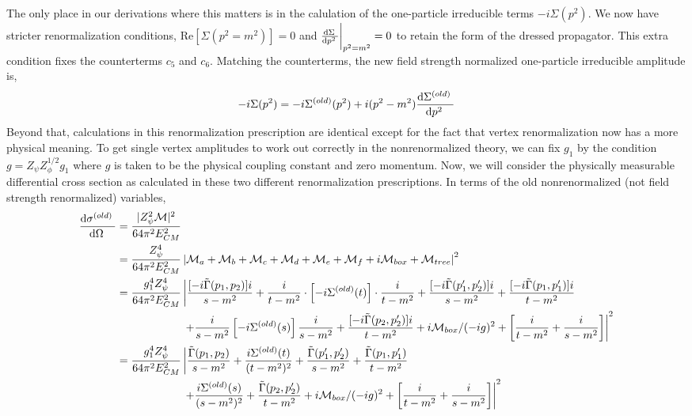 \documentclass{article}
\begin{document}
The only place in our derivations where this matters is in the calulation of the one-particle irreducible terms $-i \Sigma(p^2)$. We now have stricter renormalization conditions, $\mathrm{Re}[\Sigma(p^2 = m^2)] = 0$ and $\frac{\mathrm{d}\Sigma \:}{\mathrm{d}p^2 \:} \bigg|_{p^2 = m^2} = 0$ to retain the form of the dressed propagator. This extra condition fixes the counterterms $c_5$ and $c_6$. Matching the counterterms, the new field strength normalized one-particle irreducible amplitude is,
\[ - i \Sigma(p^2) = - i \Sigma^{(old)}(p^2) + i (p^2 - m^2) \frac{\mathrm{d}\Sigma^{(old)} \:}{\mathrm{d}p^2 \:} \] 
Beyond that, calculations in this renormalization prescription are identical except for the fact that vertex renormalization now has a more physical meaning. To get single vertex amplitudes to work out correctly in the nonrenormalized theory, we can fix $g_1$ by the condition $g = Z_\psi Z_\phi^{1/2} g_1$ where $g$ is taken to be the physical coupling constant and zero momentum. Now, we will consider the physically measurable differential cross section as calculated in these two different renormalization prescriptions. In terms of the old nonrenormalized (not field strength renormalized) variables,
\begin{align*}
\frac{\mathrm{d}\sigma^{(old)} \:}{\mathrm{d}\Omega \:} & = \frac{|Z^2_{\psi} \mathcal{M}|^2}{64 \pi^2 E_{CM}^2}
\\
& = \frac{Z^4_{\psi}}{64 \pi^2 E_{CM}^2} \left| \mathcal{M}_a + \mathcal{M}_b + \mathcal{M}_c + \mathcal{M}_d + \mathcal{M}_e + \mathcal{M}_f + i\mathcal{M}_{box} + \mathcal{M}_{tree} \right|^2 
\\
& = \frac{g_1^4 Z^4_{\psi}}{64 \pi^2 E_{CM}^2} \left|  \frac{ [-i \tilde{\Gamma}(p_1, p_2)] i}{s  - m^2} + \frac{i}{t - m^2} \cdot\left[ -i \Sigma^{(old)}(t) \right] \cdot \frac{i}{t - m^2} + \frac{[ -i \tilde{\Gamma}(p_1', p_2')]i}{s - m^2} 
+  \frac{[-i \tilde{\Gamma}(p_1, p_1')]i}{t - m^2} \right.
\\ 
& \left.
\quad \quad \quad \quad \quad \quad 
+ \frac{i}{s - m^2} \left[- i \Sigma^{(old)}(s) \right] \frac{i}{s - m^2} + \frac{[-i \tilde{\Gamma}(p_2, p_2')]i}{t - m^2} + i\mathcal{M}_{box}/(-ig)^2 +  \left[\frac{i}{t - m^2 } + \frac{i}{s - m^2 }\right] \right|^2 
\\
& = \frac{g_1^4 Z^4_{\psi}}{64 \pi^2 E_{CM}^2} \left|  \frac{ \tilde{\Gamma}(p_1, p_2)}{s  - m^2} + \frac{i \Sigma^{(old)}(t)}{(t - m^2)^2} + \frac{\tilde{\Gamma}(p_1', p_2')}{s - m^2} 
+  \frac{\tilde{\Gamma}(p_1, p_1')}{t - m^2} \right.
\\ 
& \left.
\quad \quad \quad \quad \quad \quad 
+ \frac{i \Sigma^{(old)}(s)}{(s - m^2)^2} + \frac{\tilde{\Gamma}(p_2, p_2')}{t - m^2} + i\mathcal{M}_{box}/(-ig)^2 + \left[\frac{i}{t - m^2 } + \frac{i}{s - m^2 }\right] \right|^2 
\end{align*} 
\end{document}
